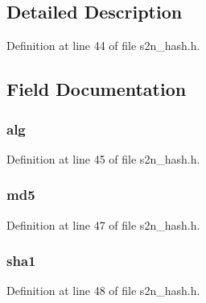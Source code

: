 \subsection{Detailed Description}


Definition at line 44 of file s2n\+\_\+hash.\+h.



\subsection{Field Documentation}
\subsubsection[{\texorpdfstring{alg}{alg}}]{ alg}\hypertarget{structs2n__hash__state_a06fad91533b24fb9c9fa94c5a207546e}{}\label{structs2n__hash__state_a06fad91533b24fb9c9fa94c5a207546e}


Definition at line 45 of file s2n\+\_\+hash.\+h.

\subsubsection[{\texorpdfstring{md5}{md5}}]{ md5}\hypertarget{structs2n__hash__state_a1509df541292683b64252e2263571047}{}\label{structs2n__hash__state_a1509df541292683b64252e2263571047}


Definition at line 47 of file s2n\+\_\+hash.\+h.

\subsubsection[{\texorpdfstring{sha1}{sha1}}]{ sha1}\hypertarget{structs2n__hash__state_a3256b7cedd3ff281fbc533855c86169f}{}\label{structs2n__hash__state_a3256b7cedd3ff281fbc533855c86169f}


Definition at line 48 of file s2n\+\_\+hash.\+h.

